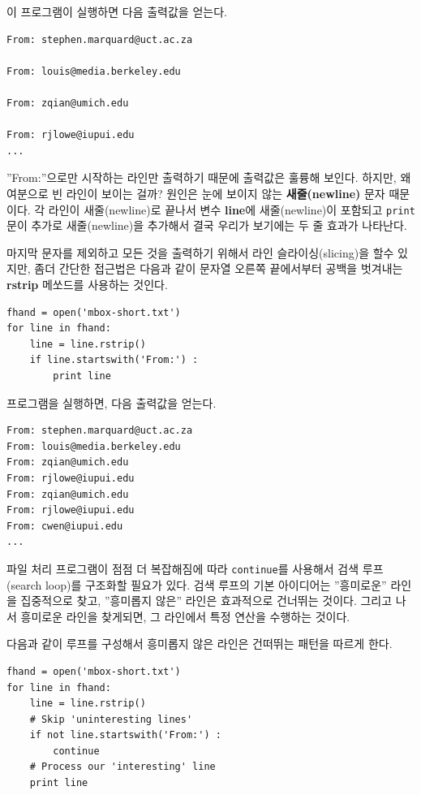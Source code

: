 이 프로그램이 실행하면 다음 출력값을 얻는다.

\beforeverb
\begin{verbatim}
From: stephen.marquard@uct.ac.za

From: louis@media.berkeley.edu

From: zqian@umich.edu

From: rjlowe@iupui.edu
...
\end{verbatim}
\afterverb
%

''From:''으로만 시작하는 라인만 출력하기 때문에 출력값은 훌륭해 보인다.
하지만, 왜 여분으로 빈 라인이 보이는 걸까?
원인은 눈에 보이지 않는 {\bf 새줄(newline)} 문자 때문이다.
각 라인이 새줄(newline)로 끝나서 변수 {\bf line}에 새줄(newline)이 포함되고 
{\tt print}문이 추가로 새줄(newline)을 추가해서 결국 우리가 보기에는 두 줄 효과가 나타난다.

마지막 문자를 제외하고 모든 것을 출력하기 위해서 라인 슬라이싱(slicing)을 할수 있지만, 
좀더 간단한 접근법은 다음과 같이 문자열 오른쪽 끝에서부터 공백을 벗겨내는 {\bf rstrip} 메쏘드를 사용하는 것인다.

\beforeverb
\begin{verbatim}
fhand = open('mbox-short.txt')
for line in fhand:
    line = line.rstrip()
    if line.startswith('From:') :
        print line
\end{verbatim}
\afterverb
%

프로그램을 실행하면, 다음 출력값을 얻는다.

\beforeverb
\begin{verbatim}
From: stephen.marquard@uct.ac.za
From: louis@media.berkeley.edu
From: zqian@umich.edu
From: rjlowe@iupui.edu
From: zqian@umich.edu
From: rjlowe@iupui.edu
From: cwen@iupui.edu
...
\end{verbatim}
\afterverb
%

파일 처리 프로그램이 점점 더 복잡해짐에 따라 {\tt continue}를 사용해서 검색 루프(search loop)를 구조화할 필요가 있다.
검색 루프의 기본 아이디어는 ''흥미로운'' 라인을 집중적으로 찾고, ''흥미롭지 않은'' 라인은 효과적으로 건너뛰는 것이다.
그리고 나서 흥미로운 라인을 찾게되면, 그 라인에서 특정 연산을 수행하는 것이다.

다음과 같이 루프를 구성해서 흥미롭지 않은 라인은 건떠뛰는 패턴을 따르게 한다.

\beforeverb
\begin{verbatim}
fhand = open('mbox-short.txt')
for line in fhand:
    line = line.rstrip()
    # Skip 'uninteresting lines'
    if not line.startswith('From:') :
        continue
    # Process our 'interesting' line
    print line
\end{verbatim}
\afterverb
%

